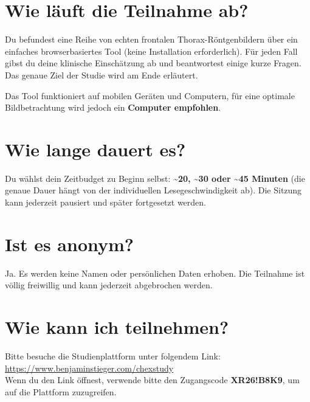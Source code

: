 \documentclass[10pt,a4paper]{article}
\begin{document}
\section{Wie läuft die Teilnahme ab?}

Du befundest eine Reihe von echten frontalen Thorax-Röntgenbildern über ein einfaches browserbasiertes Tool (keine Installation erforderlich). Für jeden Fall gibst du deine klinische Einschätzung ab und beantwortest einige kurze Fragen. Das genaue Ziel der Studie wird am Ende erläutert. 

Das Tool funktioniert auf mobilen Geräten und Computern, für eine optimale Bildbetrachtung wird jedoch ein \textbf{Computer empfohlen}.

\section{Wie lange dauert es?}

Du wählst dein Zeitbudget zu Beginn selbst: \textbf{\textasciitilde20, \textasciitilde30 oder \textasciitilde45 Minuten} (die genaue Dauer hängt von der individuellen Lesegeschwindigkeit ab). Die Sitzung kann jederzeit pausiert und später fortgesetzt werden.

\section{Ist es anonym?}

Ja. Es werden keine Namen oder persönlichen Daten erhoben. Die Teilnahme ist völlig freiwillig und kann jederzeit abgebrochen werden.

\section{Wie kann ich teilnehmen?}

Bitte besuche die Studienplattform unter folgendem Link:\\[0.25em]
\url{https://www.benjaminstieger.com/chexstudy}\\[0.25em]
Wenn du den Link öffnest, verwende bitte den Zugangscode \textbf{XR26!B8K9}, um auf die Plattform zuzugreifen.

\vfill

\noindent{}
\end{document}
